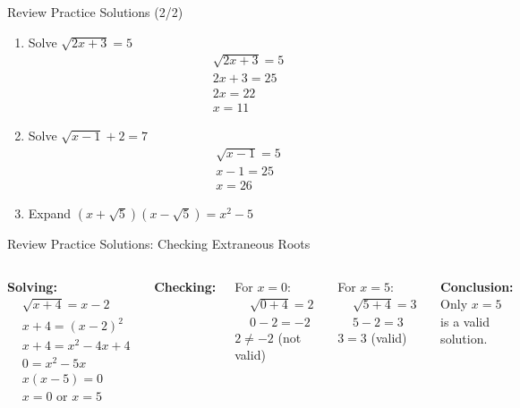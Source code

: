 \documentclass[aspectratio=169]{beamer}
\begin{document}
\begin{frame}{Review Practice Solutions (2/2)}
\begin{tcolorbox}[colback=lightgray,colframe=primary,title=Solutions]
\footnotesize
\begin{enumerate}
  \item Solve $\sqrt{2x+3} = 5$
  \begin{align*}
    &\sqrt{2x+3} = 5 \\
    &2x+3 = 25 \\
    &2x = 22 \\
    &x = 11
  \end{align*}
  \item Solve $\sqrt{x-1} + 2 = 7$
  \begin{align*}
    &\sqrt{x-1} = 5 \\
    &x-1 = 25 \\
    &x = 26
  \end{align*}
  \item Expand $(x+\sqrt{5})(x-\sqrt{5}) = x^2-5$
\end{enumerate}
\end{tcolorbox}
\end{frame}

\begin{frame}{Review Practice Solutions: Checking Extraneous Roots}
\begin{tcolorbox}[colback=lightgray,colframe=primary,title=Solution: $\sqrt{x+4} = x-2$]
\footnotesize
\begin{columns}[T]
\textbf{Solving:}
\begin{align*}
  &\sqrt{x+4} = x-2 \\
  &x+4 = (x-2)^2 \\
  &x+4 = x^2-4x+4 \\
  &0 = x^2-5x \\
  &x(x-5) = 0 \\
  &x = 0 \text{ or } x = 5
\end{align*}

\textbf{Checking:}

For $x=0$:
\begin{align*}
  &\sqrt{0+4} = 2 \\
  &0-2 = -2
\end{align*}
$2 \neq -2$ (not valid)

For $x=5$:
\begin{align*}
  &\sqrt{5+4} = 3 \\
  &5-2 = 3
\end{align*}
$3 = 3$ (valid)

\textbf{Conclusion:} Only $x=5$ is a valid solution.
\end{columns}
\end{tcolorbox}
\end{frame}
\end{document}
